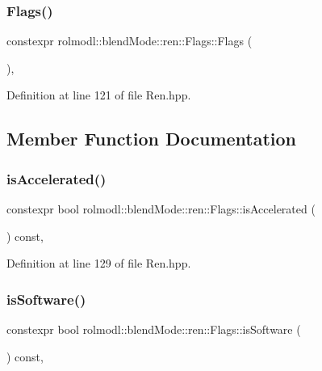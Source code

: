 \subsubsection{\texorpdfstring{Flags()}{Flags()}}
{\footnotesize\ttfamily constexpr rolmodl\+::blend\+Mode\+::ren\+::\+Flags\+::\+Flags (\begin{DoxyParamCaption}{ }\end{DoxyParamCaption})\hspace{0.3cm}{\ttfamily [inline]}, {\ttfamily [noexcept]}}



Definition at line 121 of file Ren.\+hpp.



\subsection{Member Function Documentation}
\mbox{\label{structrolmodl_1_1blend_mode_1_1ren_1_1_flags_ad17acc27ab00767ec842250049ce00d2}} 
\subsubsection{\texorpdfstring{isAccelerated()}{isAccelerated()}}
{\footnotesize\ttfamily constexpr bool rolmodl\+::blend\+Mode\+::ren\+::\+Flags\+::is\+Accelerated (\begin{DoxyParamCaption}{ }\end{DoxyParamCaption}) const\hspace{0.3cm}{\ttfamily [inline]}, {\ttfamily [noexcept]}}



Definition at line 129 of file Ren.\+hpp.

\mbox{\label{structrolmodl_1_1blend_mode_1_1ren_1_1_flags_af3311b704a5d87078cb7b7a621162e88}} 
\subsubsection{\texorpdfstring{isSoftware()}{isSoftware()}}
{\footnotesize\ttfamily constexpr bool rolmodl\+::blend\+Mode\+::ren\+::\+Flags\+::is\+Software (\begin{DoxyParamCaption}{ }\end{DoxyParamCaption}) const\hspace{0.3cm}{\ttfamily [inline]}, {\ttfamily [noexcept]}}



